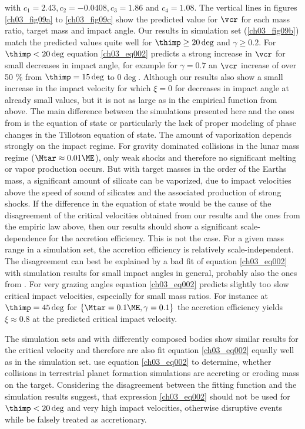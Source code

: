 with $c_1 = 2.43, c_2 = - 0.0408, c_3 = 1.86$ and $c_4 = 1.08$. The vertical lines in figures \ref{ch03_fig09a} to \ref{ch03_fig09c} show the predicted value for $\vcr$ for each mass ratio, target mass and impact angle. Our results in simulation set \css (\ref{ch03_fig09b}) match the predicted values quite well for $\thimp \ge 20 \deg$ and $\gamma \ge 0.2$. For $\thimp < 20 \deg$ equation \ref{ch03_eq002} predicts a strong increase in $\vcr$ for small decreases in impact angle, for example for $\gamma = 0.7$ an $\vcr$ increase of over 50 \% from $\thimp = 15 \deg$ to $0 \deg$. Although our results also show a small increase in the impact velocity for which $\xi = 0$ for decreases in impact angle at already small values, but it is not as large as in the empirical function from above. The main difference between the simulations presented here and the ones from \cite{2010ApJ...714L..21K} is the equation of state or particularly the lack of proper modeling of phase changes in the Tillotson equation of state. The amount of vaporization depends strongly on the impact regime. For gravity dominated collisions in the lunar mass regime ($\Mtar \approx 0.01 \ME$), only weak shocks and therefore no significant melting or vapor production occurs. But with target masses in the order of the Earths mass, a significant amount of silicate can be vaporized, due to impact velocities above the speed of sound of silicates and the associated production of strong shocks. If the difference in the equation of state would be the cause of the disagreement of the critical velocities obtained from our results and the ones from the empiric law above, then our results should show a significant scale-dependence for the accretion efficiency. This is not the case. For a given mass range in a simulation set, the accretion efficiency is relatively scale-independent. The disagreement can best be explained by a bad fit of equation \ref{ch03_eq002} with simulation results for small impact angles in general, probably also the ones from \cite{2010ApJ...714L..21K}. For very grazing angles equation \ref{ch03_eq002} predicts slightly too slow critical impact velocities, especially for small mass ratios. For instance at $\thimp = 45 \deg$ for $\{ \Mtar = 0.1 \ME, \gamma = 0.1\}$ the accretion efficiency yields $\xi \approx 0.8$ at the predicted critical impact velocity.

The simulation sets \iss and \rss with differently composed bodies show similar results for the critical velocity and therefore are also fit equation \ref{ch03_eq002} equally well as in the \css simulation set. \cite{2010ApJ...714L..21K} use equation \ref{ch03_eq002} to determine, whether collisions in terrestrial planet formation simulations are accreting or eroding mass on the target. Considering the disagreement between the fitting function and the simulation results suggest, that expression \ref{ch03_eq002} should not be used for $\thimp < 20 \deg$ and very high impact velocities, otherwise disruptive events while be falsely treated as accretionary.

